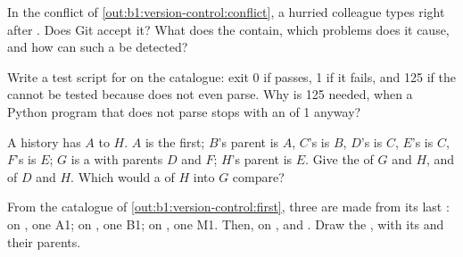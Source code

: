 \begin{exercise}[$\star\star$]\label{exo:b1:version-control:6}
In the conflict of \cref{out:b1:version-control:conflict}, a hurried colleague types 
right after . Does Git accept it? What does the  contain, which problems does it cause, and
how can such a  be detected?
\end{exercise}

\begin{exercise}[$\star\star$]\label{exo:b1:version-control:7}
Write a test script  for  on the catalogue: exit 0 if  passes,
1 if it fails, and 125 if the  cannot be tested because  does not even parse. Why is 125 needed,
when a Python program that does not parse stops with an  of 1 anyway?
\end{exercise}

\begin{exercise}[$\star\star$]\label{exo:b1:version-control:8}
A history has  $A$ to $H$. $A$ is the first; $B$'s parent is $A$, $C$'s is $B$, $D$'s is $C$, $E$'s is $C$, $F$'s
is $E$; $G$ is a  with parents $D$ and $F$; $H$'s parent is $E$. Give the  of $G$ and $H$, and of $D$ and
$H$. Which  would a  of $H$ into $G$ compare?
\end{exercise}

\begin{exercise}[$\star\star$]\label{exo:b1:version-control:9}
From the catalogue of \cref{out:b1:version-control:first}, three  are made from its last : on ,
one  A1; on , one  B1; on , one  M1. Then, on ,  and
. Draw the , with its   and their parents.
\end{exercise}

